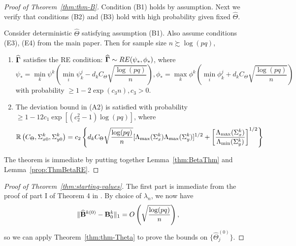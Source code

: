 \begin{proof}[Proof of Theorem~\ref{thm:thm-B}]
Condition (B1) holds by assumption. Next we verify that conditions (B2) and (B3) hold with high probability given fixed $\widehat \Theta$.

\begin{Lemma}\label{prop:ThmBetaRE}
Consider deterministic $\widehat \Theta$ satisfying assumption (B1). Also assume conditions (E3), (E4) from the main paper. Then for sample size $n \succsim \log (pq)$,

\begin{enumerate}
\item $\widehat {{\boldsymbol{\Gamma}}}$ satisfies the RE condition: $ \widehat {{\boldsymbol{\Gamma}}} \sim RE (\psi_*, \phi_*)$, where 
%
$$
\psi_* = \min_k \psi^k \left( \min_i \psi_k^j - d_k C_\Theta \sqrt{ \frac{ \log (pq)}{n}}\right), 
\phi_* = \max_k \phi^k \left( \min_i \phi_k^j + d_k C_\Theta \sqrt{ \frac{ \log (pq)}{n}}\right)
$$
%
with probability $\geq 1 - 2 \exp(c_3 n), c_3>0$.
%
\item The deviation bound in (A2) is satisfied with probability $ \geq 1 - 12 c_1 \exp[ (c_2^2-1) \log (pq)]$, where
%
$$
{\mathbb{R}} \left(C_\Theta, \Sigma_{x0}^k, \Sigma_{y0}^k \right) =
c_2 \left\{ d_k C_\Theta \sqrt{ \frac{ \log (pq)}{n}}
[ \Lambda_{\max} (\Sigma_x^k) \Lambda_{\max} (\Sigma_y^k)]^{1/2} +
\left[ \frac{\Lambda_{\max} (\Sigma_x^k)}{\Lambda_{\min} (\Sigma_y^k) } \right]^{1/2} \right\}
$$
%
\end{enumerate}
\end{Lemma}

The theorem is immediate by putting together Lemma~\ref{thm:BetaThm} and Lemma~\ref{prop:ThmBetaRE}.
\end{proof}

\begin{proof}[Proof of Theorem~\ref{thm:starting-values}]
The first part is immediate from the proof of part I of Theorem 4 in \cite{LinEtal16}. By choice of $\lambda_n$, we now have
%
$$
\| \widehat {{\mathbf{B}}}^{k (0)} - {\mathbf{B}}^k_0 \|_1 = O\left( \sqrt{ \frac{ \log (pq)}{n}} \right),
$$
%
so we can apply Theorem~\ref{thm:thm-Theta} to prove the bounds on $\{\widehat \Theta_j^{(0)} \}$.
\end{proof}

%



